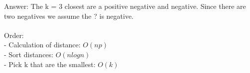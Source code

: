 Answer: The k = 3 closest are a positive negative and negative. Since there are two negatives we assume the ? is negative.\\\\
Order:\\
- Calculation of distance: $O(np)$ \\
- Sort distances: $O(n log n)$ \\
- Pick k that are the smallest: $O(k)$\\\\
